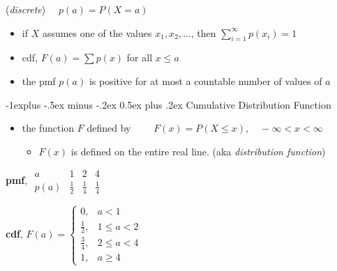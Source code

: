 \documentclass[10pt, landscape]{article}
\makeatletter
\renewcommand{\subsection}{\@startsection{subsection}{2}{0mm}%
  {-1explus -.5ex minus -.2ex}%
  {0.5ex plus .2ex}%
{\normalfont\normalsize\bfseries}}
\makeatother
\begin{document}
\begin{multicols*}{3}
   (\textit{discrete}) $\quad p(a) = P(X=a) $
  \begin{itemize}
    \item if $X$ assumes one of the values $x_1, x_2, \dots$, then $\sum\limits^\infty_{i=1} p(x_i) = 1$
    \item cdf, $F(a) = \sum p(x)$ for all $x \leq a$
    \item the pmf $ p(a) $ is positive for at most a countable number of values of $a$
  \end{itemize}

  \subsection{Cumulative Distribution Function}
  \begin{itemize}
    \item {} the function $F$ defined by $\quad\quad F(x) = P(X \leq x), \quad -\infty < x < \infty$
      \begin{itemize}
        \item $F(x)$ is defined on the entire real line. (aka \textit{distribution function})
      \end{itemize}
  \end{itemize}

  \begin{minipage}[c]{0.45\linewidth}
    \begin{tightcenter}
      \textbf{pmf},
      $\begin{array}{c|ccc}
        a & 1 & 2 & 4 \\\hline
        p(a) & \frac{1}{2} & \frac{1}{4} & \frac{1}{4} 
      \end{array}$
    \end{tightcenter}
  \end{minipage}
  \begin{minipage}[c]{0.45\linewidth}
    \begin{tightcenter}
      \textbf{cdf},
      $F(a) = \begin{cases}
        0, &a < 1 \\
        \frac{1}{2} , &1 \leq a < 2 \\
        \frac{3}{4} , &2 \leq a < 4 \\
        1, &a \geq 4
      \end{cases}$
    \end{tightcenter}
  \end{minipage}


\end{multicols*}
\end{document}
